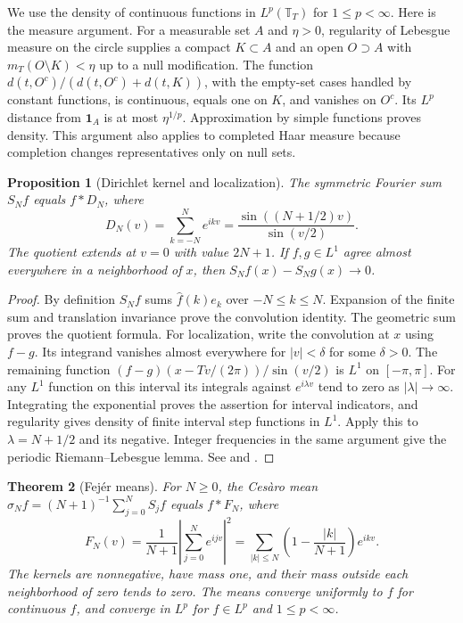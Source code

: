 \documentclass[11pt,oneside,openany]{book}
\newtheorem{theorem}{Theorem}[chapter]
\newtheorem{proposition}[theorem]{Proposition}
\theoremstyle{definition}
\theoremstyle{remark}
\begin{document}
We use the density of continuous functions in $L^p(\mathbb T_T)$ for
$1\le p<\infty$. Here is the measure argument. For a measurable set $A$
and $\eta>0$, regularity of Lebesgue measure on the circle supplies a
compact $K\subset A$ and an open $O\supset A$ with $m_T(O\setminus K)<\eta$
up to a null modification. The function
$d(t,O^c)/(d(t,O^c)+d(t,K))$, with the empty-set cases handled by constant
functions, is continuous, equals one on $K$, and vanishes on $O^c$.
Its $L^p$ distance from $\mathbf 1_A$ is at most $\eta^{1/p}$.
Approximation by simple functions proves density. This argument also
applies to completed Haar measure because completion changes representatives
only on null sets.

\begin{proposition}[Dirichlet kernel and localization]
\label{p102:U1-01}
The symmetric Fourier sum $S_N f$ equals $f*D_N$, where
\[
 D_N(v)=\sum_{k=-N}^{N}e^{ikv}
       =\frac{\sin((N+1/2)v)}{\sin(v/2)} .
\]
The quotient extends at $v=0$ with value $2N+1$. If $f,g\in L^1$
agree almost everywhere in a neighborhood of $x$, then
$S_N f(x)-S_N g(x)\to0$.
\end{proposition}

\begin{proof}
By definition $S_N f$ sums $\widehat f(k)e_k$ over $-N\le k\le N$.
Expansion of the finite sum and translation invariance prove the
convolution identity. The geometric sum proves the quotient formula.
For localization, write the convolution at $x$ using $f-g$. Its
integrand vanishes almost everywhere for $|v|<\delta$ for some
$\delta>0$. The remaining function
$(f-g)(x-Tv/(2\pi))/\sin(v/2)$ is $L^1$ on $[-\pi,\pi]$.
For any $L^1$ function on this interval its integrals against
$e^{i\lambda v}$ tend to zero as $|\lambda|\to\infty$. Integrating the
exponential proves the assertion for interval indicators, and regularity
gives density of finite interval step functions in $L^1$. Apply this to
$\lambda=N+1/2$ and its negative. Integer frequencies in the same
argument give the periodic Riemann--Lebesgue lemma. See
\cite[Section~3.1.3]{grafakos} and
\cite[Chapters~2--3]{stein-shakarchi}.
\end{proof}

\begin{theorem}[Fej\'er means]
\label{p102:AN-06-C01-S02}
For $N\ge0$, the Ces\`aro mean
$\sigma_N f=(N+1)^{-1}\sum_{j=0}^N S_j f$ equals $f*F_N$, where
\[
 F_N(v)=\frac1{N+1}\left|\sum_{j=0}^N e^{ijv}\right|^2
       =\sum_{|k|\le N}\left(1-\frac{|k|}{N+1}\right)e^{ikv}.
\]
The kernels are nonnegative, have mass one, and their mass outside
each neighborhood of zero tends to zero. The means converge uniformly
to $f$ for continuous $f$, and converge in $L^p$ for $f\in L^p$ and
$1\le p<\infty$.
\end{theorem}
\end{document}
